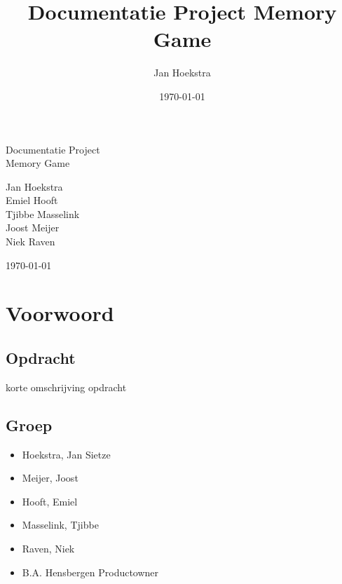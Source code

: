 \documentclass[a4paper,titlepage,11pt]{article}
\title{Documentatie Project Memory Game}
\date{\today}
\author{Jan Hoekstra}
\def\myauthor{Jan Hoekstra} %
\def\mytitle{Documentatie Project} %
\def\mysubtitle{Memory Game}
\def\mydate{\today} %
\def\mycoauthors{
Emiel Hooft \\
Tjibbe Masselink \\
Joost Meijer \\
Niek Raven
}
\begin{document}

\begin{titlepage}
\vspace{5cm}

\centering
\vspace*{\fill}
\parbox[c][5cm][t]{10cm}{
  \color{white}\Huge\centering

  \mytitle \\
  \mysubtitle
  
  \vspace{3cm}
\huge
  \myauthor \\
  \mycoauthors
  
  \vspace{3cm}

  \mydate
}
\vspace*{\fill}

\end{titlepage}
\tableofcontents
\clearpage
{}

\section{Voorwoord}

\subsection{Opdracht}

korte omschrijving opdracht

\subsection{Groep}

\begin{itemize}
\item Hoekstra, Jan Sietze
\item Meijer, Joost
\item Hooft, Emiel
\item Masselink, Tjibbe
\item Raven, Niek
\item B.A. Hensbergen \- Productowner
\end{itemize}

\clearpage
\end{document}
